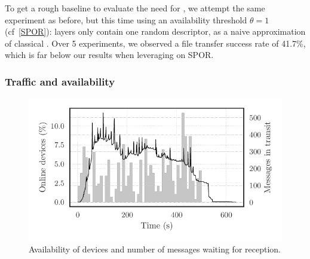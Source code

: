 To get a rough baseline to evaluate the need for , 
we attempt the same experiment as before, but this time using an availability threshold $\theta = 1$ (cf~\ref{SPOR}): 
layers only contain one random descriptor, as a naive approximation of
classical \OR. 
Over 5 experiments, we observed a file transfer success rate of 41.7\%, which is far below our results when leveraging on \ac{SPOR}.



\subsubsection{Traffic and availability} %
\label{ssub:traffic_and_availability}


\begin{figure}[t]
  \centering
  \includegraphics[width=0.9\columnwidth]{figures/avail.pdf}

  \caption{\label{fig:completion_vs_size}
  Availability of devices and number of messages waiting for reception.}
\end{figure}








